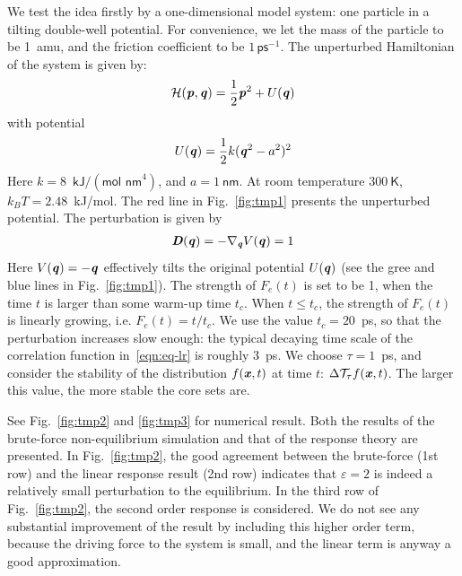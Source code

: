 \documentclass[aip,jcp,a4paper,reprint,onecolumn]{revtex4-1}
\newcommand{\vect}[1]{\textbf{\textit{#1}}}
\newcommand{\mh}{\mathcal H}
\newcommand{\eps}{\varepsilon}
\newcommand{\mt}{\mathcal T}
\begin{document}
We test the idea firstly by a one-dimensional model system: one particle in a
tilting double-well potential. For convenience, we let the mass of the
particle to be 1~\textsf{amu},
and the friction coefficient to be $1\,\textsf{ps}^{-1}$.
The unperturbed
Hamiltonian of the system is given by:
\begin{align}
  \mh (\vect p, \vect q) = \frac 12 \vect p^2 + U(\vect q) 
\end{align}
with potential
\begin{align}
  U(\vect q) = \frac12 k (\vect q^2 - a^2)^2
\end{align}
Here $k = 8$~$\textsf{kJ} / (\textsf{mol nm}^4)$, and $ a = 1\ \textsf{nm}$.
At room temperature $300\ \textsf{K}$, $k_BT = 2.48$~\textsf{kJ/mol}.
The red line in Fig.~\ref{fig:tmp1} presents the unperturbed potential.
The perturbation is given by
\begin{align}
  \vect D(\vect q) = -\nabla_{\vect q} V(\vect q) = 1
\end{align}
Here $V(\vect q) = -\vect q$   effectively tilts the original
potential $U(\vect q)$ (see the gree and blue lines in Fig.~\ref{fig:tmp1}).
The strength of $F_e(t)$ is
set to be 1, when the time $t$ is larger than some warm-up time $t_c$.
When $t \leq t_c$, the strength of $F_e(t)$ is linearly growing,
i.e. $ F_e(t) = t/t_c$.
We use the value $t_c = 20$~\textsf{ps}, so that the perturbation increases slow
enough: the typical decaying time scale of the correlation function
in~\eqref{eqn:eq-lr} is roughly 3~\textsf{ps}.
We choose $\tau = 1$~\textsf{ps}, and
consider the stability of the
distribution $f(\vect x, t)$ at time $t$: $\Delta\mt_\tau f(\vect x, t)$.
The larger
this value, the more stable the core sets are.

See Fig.~\ref{fig:tmp2} and \ref{fig:tmp3} for numerical result.  Both
the results of the brute-force non-equilibrium simulation
and that of the response theory are presented.
In Fig.~\ref{fig:tmp2},
the good agreement between the brute-force (1st row)
and the linear response result (2nd row) indicates that $\eps = 2$ is
indeed a relatively small perturbation to the equilibrium.
In the third row of Fig.~\ref{fig:tmp2},
the second order response is considered. We do not see any
substantial improvement of the result by including this higher order term,
because the
driving force to the system is small,
and the linear term is anyway a good approximation.
\end{document}
